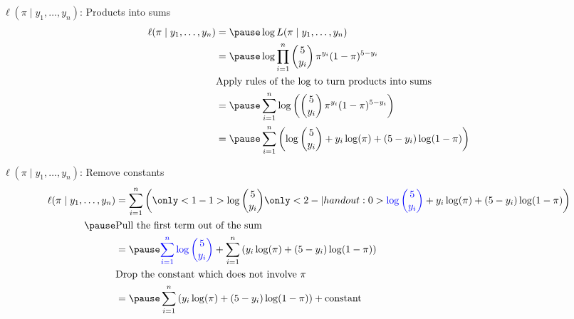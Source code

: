 \documentclass{beamer}
\newcommand{\blue}[1]{\textcolor{blue}{#1}}
\newcommand{\black}[1]{\textcolor{black}{#1}}
\begin{document}
\begin{frame}{$\ell(\pi\mid y_1,\dots,y_n)$: Products into sums}
$$\begin{aligned}
\ell(\pi\mid y_1,\dots,y_n) &= \pause \log L(\pi\mid y_1,\dots,y_n) \\
&= \pause \log \prod_{i=1}^n \left(\begin{matrix}5 \\ y_i\end{matrix}\right)\pi^{y_i}(1-\pi)^{5-y_i} \\
&\text{Apply rules of the log to turn products into sums} \\
&=\pause \sum_{i=1}^n \log\left(\left(\begin{matrix}5 \\ y_i\end{matrix}\right)\pi^{y_i}(1-\pi)^{5-y_i}\right) \\
&=\pause \sum_{i=1}^n \left(\log\left(\begin{matrix}5 \\ y_i\end{matrix}\right) + y_i\log(\pi) + (5 - y_i)\log(1-\pi)\right)
\end{aligned}$$
\end{frame}

\begin{frame}{$\ell(\pi\mid y_1,\dots,y_n)$: Remove constants}
$$\begin{aligned}
\ell(\pi\mid y_1,\dots,y_n) &=
	\sum_{i=1}^n \left(
	\only<1-1>{\black{\log\left(\begin{matrix}5 \\ y_i\end{matrix}\right)}}
	\only<2-| handout:0>{\blue{\log\left(\begin{matrix}5 \\ y_i\end{matrix}\right)}}
	 + y_i\log(\pi) + (5 - y_i)\log(1-\pi)\right) \\ \pause
&\text{Pull the first term out of the sum} \\
&= \pause \blue{\sum_{i=1}^n \log\left(\begin{matrix}5 \\ y_i\end{matrix}\right)} + \sum_{i=1}^n \left(y_i\log(\pi) + (5 - y_i)\log(1-\pi)\right) \\
&\text{Drop the constant which does not involve $\pi$} \\
&= \pause \sum_{i=1}^n \left(y_i\log(\pi) + (5 - y_i)\log(1-\pi)\right) + \text{constant}
\end{aligned}$$
\end{frame}
\end{document}

